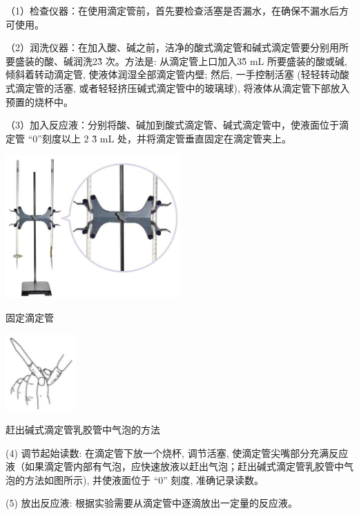 \documentclass[10pt]{article}
\begin{document}
（1）检查仪器：在使用滴定管前，首先要检查活塞是否漏水，在确保不漏水后方可使用。

（2）润洗仪器：在加入酸、碱之前，洁净的酸式滴定管和碱式滴定管要分别用所要盛装的酸、碱润洗2\~3 次。方法是: 从滴定管上口加入3\~5 mL 所要盛装的酸或碱, 倾斜着转动滴定管, 使液体润湿全部滴定管内壁; 然后, 一手控制活塞 (轻轻转动酸式滴定管的活塞, 或者轻轻挤压碱式滴定管中的玻璃球), 将液体从滴定管下部放入预置的烧杯中。

（3）加入反应液：分别将酸、碱加到酸式滴定管、碱式滴定管中，使液面位于滴定管 “0”刻度以上 2 \~3 mL 处，并将滴定管垂直固定在滴定管夹上。


\begin{center}
\includegraphics[max width=0.5\textwidth]{images/0190da9d-8bfd-732f-bc2c-0b21d0f13b91_97_248962.jpg}
\end{center}

固定滴定管

\begin{center}
\includegraphics[max width=0.2\textwidth]{images/0190da9d-8bfd-732f-bc2c-0b21d0f13b91_97_581781.jpg}
\end{center}

赶出碱式滴定管乳胶管中气泡的方法

(4) 调节起始读数: 在滴定管下放一个烧杯, 调节活塞, 使滴定管尖嘴部分充满反应液（如果滴定管内部有气泡，应快速放液以赶出气泡；赶出碱式滴定管乳胶管中气泡的方法如图所示), 并使液面位于 “0” 刻度, 准确记录读数。

(5) 放出反应液: 根据实验需要从滴定管中逐滴放出一定量的反应液。
\end{document}
